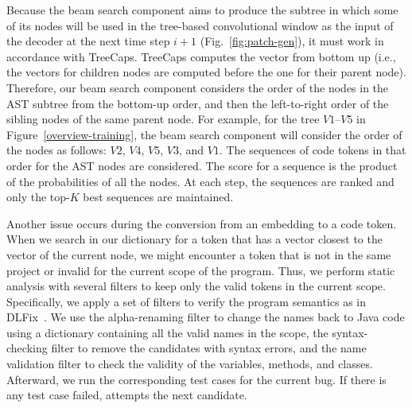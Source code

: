 Because the beam search component aims to produce the subtree
in which some of its nodes will be used in the tree-based convolutional
window as the input of the decoder at the next time step $i+1$
(Fig.~\ref{fig:patch-gen}), it must work in accordance with 
TreeCaps. TreeCaps computes the vector from bottom up (i.e.,
the vectors for children nodes are computed before the one for their
parent node). Therefore, our beam search component considers the order
of the nodes in the AST subtree from the bottom-up order, and then the
left-to-right order of the sibling nodes of the same parent node. For
example, for the tree $V1$--$V5$ in Figure~\ref{overview-training},
the beam search component will consider the order of the nodes as
follows: $V2$, $V4$, $V5$, $V3$, and $V1$. The sequences of code
tokens in that order for the AST nodes are considered. The score for a
sequence is the product of the probabilities of all the nodes. At each
step, the sequences are ranked and only the top-$K$ best sequences are
maintained.

Another issue occurs during the conversion from an embedding to a code
token. When we search in our dictionary for a token that has a vector
closest to the vector of the current node, we
might encounter a token that is not in the same project or invalid for
the current scope of the program. Thus, we perform static analysis
with several filters to keep only the valid tokens in the current
scope. Specifically, we apply a set of filters to verify the program
semantics as in DLFix~\cite{icse20}. We use the alpha-renaming filter
to change the names back to Java code using a dictionary
containing all the valid names in the scope, the syntax-checking
filter to remove the candidates with syntax errors, and the name
validation filter to check the validity of the variables, methods, and
classes.
Afterward, we run the corresponding test cases for the current
bug. If there is any test case failed, {\tool} attempts the next
candidate.


